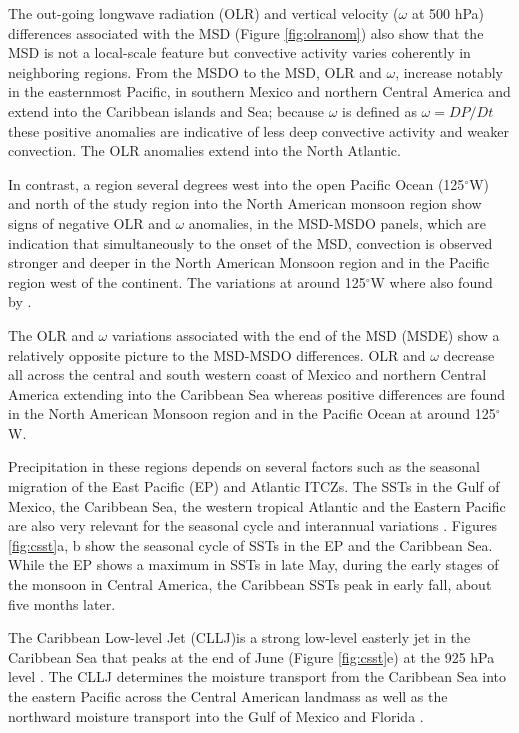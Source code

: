  The out-going longwave radiation (OLR) and vertical velocity ($\omega$ at 500 hPa) differences associated with the MSD (Figure \ref{fig:olranom}) also show that the MSD is not a local-scale feature but convective activity varies coherently in neighboring regions. From the MSDO to the MSD, OLR and $\omega$, increase notably in the easternmost Pacific, in southern Mexico and northern Central America and extend into the Caribbean islands and Sea; because $\omega$ is defined as $\omega=DP/Dt$  these positive anomalies are indicative of less deep convective activity and weaker convection. The OLR anomalies extend into the North Atlantic. 
 
 In contrast, a region several degrees west into the open Pacific Ocean (125$^\circ$W) and north of the study region into the North American monsoon region show signs of negative OLR and $\omega$ anomalies, in the MSD-MSDO panels, which are indication that simultaneously to the onset of the MSD,  convection is observed stronger and deeper in the North American Monsoon region and in the Pacific region west of the continent. The variations at around 125$^\circ$W where also found by \cite{herrera2015}. 
 
 The OLR and $\omega$ variations associated with the end of the MSD (MSDE) show a relatively opposite picture to the MSD-MSDO differences. OLR and $\omega$ decrease all across the central and south western coast of Mexico and northern Central America extending into the Caribbean Sea whereas positive differences are found in the North American Monsoon region and in the Pacific Ocean at around 125$^\circ$W.  


Precipitation in these regions depends on several factors such as the seasonal migration of the East Pacific (EP) and Atlantic ITCZs. The SSTs in the Gulf of Mexico, the Caribbean Sea, the western tropical Atlantic and the Eastern Pacific are also very relevant for the seasonal cycle and interannual variations \citep{magana1999,amador2008,straffon2019}. Figures \ref{fig:csst}a, b show the seasonal cycle of SSTs in the EP and the Caribbean Sea. While the EP shows a maximum in SSTs in late May, during the early stages of the monsoon in Central America, the Caribbean SSTs peak in early fall, about five months later. 


The Caribbean Low-level Jet (CLLJ)is a strong low-level easterly jet in the Caribbean Sea that peaks at the end of June (Figure \ref{fig:csst}e) at the 925 hPa level \citep{amador2008,herrera2015,maldonado2016}. The CLLJ  determines the moisture transport from the Caribbean Sea into the eastern Pacific across the Central American landmass as well as the northward moisture transport into the Gulf of Mexico and Florida \citep{munoz2008,hidalgo2015,maldonado2016}.


